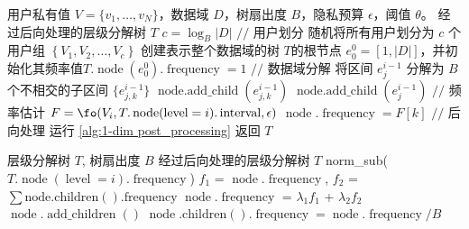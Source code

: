 \begin{algorithm}[!t]
	\begin{algorithmic}[1]
        \REQUIRE 用户私有值 $V=\{v_1, \ldots, v_N\}$，数据域 $D$，树扇出度 $B$，隐私预算 $\epsilon$，阈值 $\theta$。
        \ENSURE 经过后向处理的\myahead 层级分解树 $T$
		\STATE $c = {\log_B}|D|$
		\STATE $//$ 用户划分
        \STATE 随机将所有用户划分为 $c$ 个用户组 $\left\{ V_1, V_2, \ldots, V_c \right\}$
        \STATE 创建表示整个数据域的树 $T$的根节点 $e^0_0 = [1, |D|]$，并初始化其频率值$T.\operatorname{node}(e^0_0).\operatorname{frequency} = 1$
            \STATE $//$ 数据域分解
            \STATE 将区间 $e^{i-1}_j$ 分解为 $B$ 个不相交的子区间 $\{e^{i-1}_{j,k}\}$
    		\STATE $\operatorname{node.add\_child}(e^{i-1}_{j,k})$
            \ENDFOR
            \ELSE
            \STATE $\operatorname{node.add\_child}(e^{i-1}_{j})$
            \ENDIF    		
            \ENDFOR
            \STATE $//$ 频率估计
            \STATE $F = \fo(V_i, T.\operatorname{node}(\operatorname{level}=i).\operatorname{interval}, \epsilon)$
    		\STATE $\operatorname{node}.\operatorname{frequency} = F[k]$
            \ENDFOR
        \ENDFOR
        \STATE $//$ 后向处理
        \STATE 运行 \autoref{alg:1-dim post_processing}
        \STATE 返回 $T$
	\end{algorithmic}
    \caption{构建一维\myahead 层级分解树}
    \label{Construct 1-dim prototype tree}
\end{algorithm}

\begin{algorithm}[!t]
	\caption{后向处理}
	\label{alg:1-dim post_processing}
	\begin{algorithmic}[1]
        \REQUIRE \myahead 层级分解树 $T$, 树扇出度 $B$
        \ENSURE 经过后向处理的\myahead 层级分解树 $T$
		\STATE norm\_sub($T.\operatorname{node}(\operatorname{level}=i).\operatorname{frequency}$)
        \ENDFOR    
            \STATE $f_1$ = $\operatorname{node}.\operatorname{frequency}$, $f_2$ = $\sum{\operatorname{node.children().frequency}}$
		    \STATE $\operatorname{node}.\operatorname{frequency}$ = $\lambda_1$$f_1$ + $\lambda_2$$f_2$
            \ENDFOR 
        \ENDFOR    
		            \STATE $\operatorname{node}.\operatorname{add\_children}()$
		            \STATE $\operatorname{node}.\operatorname{children()}.\operatorname{frequency} = \operatorname{node}.\operatorname{frequency}/B$
                    \ENDIF
            \ENDFOR 
        \ENDFOR    
    \end{algorithmic}
\end{algorithm}

